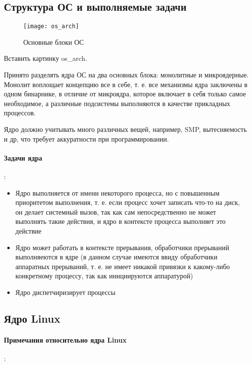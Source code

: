 \subsection{Структура ОС и выполняемые задачи}

\begin{figure}
\texttt{[image: os\_arch]}
\caption{Основные блоки ОС}
\label{img::les1::os_arch}
\end{figure}
Вставить картинку os\_arch.

Принято разделять ядра ОС на два основных блока: монолитные и микроядерные. Монолит воплощает концепцию все в себе, т. е. все
механизмы ядра заключены в одном бинарнике, в отличие от микроядра, которое включает в себя только самое необходимое, а различные
подсистемы выполняются в качестве прикладных процессов.

Ядро должно учитывать много различных вещей, например, SMP, вытесняемость и др, что требует аккуратности при программировании.

\paragraph{Задачи ядра}:

\begin{itemize}
\item Ядро выполняется от имени некоторого процесса, но с повышенным приоритетом выполнения, т. е. если процесс хочет записать
что-то на диск, он делает системный вызов, так как сам непосредственно не может выполнять такие действия, и ядро в контексте
процесса выполняет это действие

\item Ядро может работать в контексте прерывания, обработчики прерываний выполняеются в ядре (в данном случае имеются ввиду
обработчики аппаратных прерываний, т. е. не имеет никакой привязки к какому-либо конкретному процессу, так как инициируются
аппаратурой)

\item Ядро диспетчиризирует процессы
\end{itemize}

\subsection{Ядро Linux}

\paragraph{Примечания относительно ядра Linux}:

